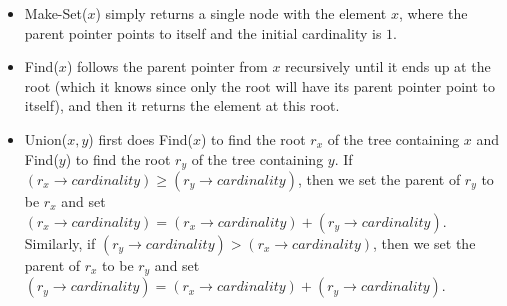 \documentclass{article}
\begin{document}
\begin{itemize}
	\item Make-Set($x$) simply returns a single node with the element $x$, where the parent pointer points to itself and the initial cardinality is $1$.

	\item Find($x$) follows the parent pointer from $x$ recursively until it ends up at the root (which it knows since only the root will have its parent pointer point to itself), and then it returns the element at this root.

	\item Union($x,y$) first does Find($x$) to find the root $r_x$ of the tree containing $x$ and Find($y$) to find the root $r_y$ of the tree containing $y$.  If $(r_x \rightarrow cardinality) \geq (r_y \rightarrow cardinality)$, then we set the parent of $r_y$ to be $r_x$ and set $(r_x \rightarrow cardinality) = (r_x \rightarrow cardinality) + (r_y \rightarrow cardinality)$.  Similarly, if $(r_y \rightarrow cardinality) > (r_x \rightarrow cardinality)$, then we set the parent of $r_x$ to be $r_y$ and set $(r_y \rightarrow cardinality) = (r_x \rightarrow cardinality) + (r_y \rightarrow cardinality)$.
\end{itemize}
\end{document}
